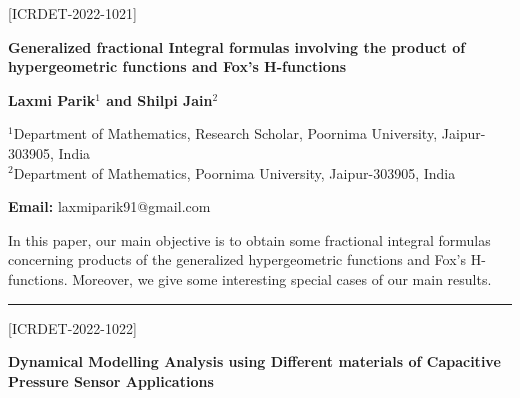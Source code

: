 \documentclass[twoside,11pt]{amsart}
\begin{document}
\vskip 5mm
\begin{flushleft}
\centerline{[ICRDET-2022-1021]}
\end{flushleft}
\begin{center}\bf\LARGE
Generalized fractional Integral formulas involving the product of hypergeometric functions and Fox's H-functions



\end{center}
\vskip 5mm

\centerline{\textbf{Laxmi Parik$^{1}$ and Shilpi Jain$^{2}$}}
\vskip 5mm
\newpage
\vskip 2mm
\begin{flushleft}
$^{1}$Department of Mathematics, Research Scholar, Poornima University, Jaipur-
303905, India\\
$^{2}$Department of Mathematics, Poornima University, Jaipur-303905, India
\vskip 5mm
\end{flushleft}
\vskip 2mm
\begin{flushleft}
{\bf Email:} laxmiparik91@gmail.com
\end{flushleft}
\vskip 5mm
In this paper, our main objective is to obtain some fractional integral formulas concerning products of the generalized hypergeometric functions and Fox's H-functions. Moreover, we give some interesting special cases of our main results.
\vskip 2mm
\rule{\textwidth}{0.5pt}
\vskip 5mm
\begin{flushleft}
\centerline{[ICRDET-2022-1022]}
\end{flushleft}
\begin{center}\bf\LARGE
Dynamical Modelling Analysis using Different materials of Capacitive Pressure Sensor Applications



\end{center}
\vskip 5mm
\end{document}

